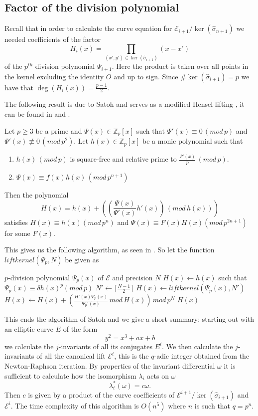 \subsection{Factor of the division polynomial} \label{satohdiv}
Recall that in order to calculate the curve equation for $\mathscr{E}_{i+1}/\ker(\widehat{\sigma}_{n+1})$
we needed coefficients of the factor
$$H_i(x) = \prod_{(x',y')\in \ker(\widehat{\sigma}_{i+1})} (x-x')$$
of the $p^{th}$ division polynomial $\Psi_{i+1}$. Here the product is taken over all points in
the kernel excluding the identity $O$ and up to sign. Since $\#\ker(\widehat{\sigma}_{i+1}) = p$ we have
that $\deg(H_i(x)) = \frac{p-1}{2}$.

The following result is due to Satoh and serves as a modified Hensel lifting \cite{Robert}, it can be found
in \cite{Satoh} and \cite{Handbook}.
\begin{prop}
 Let $p\geq 3$ be a prime and $\Psi(x) \in \mathbb{Z}_p[x]$ such that $\Psi'(x) \equiv 0\, (mod\, p)$ and
$\Psi'(x) \not\equiv 0\, (mod\, p^2)$. Let $h(x) \in \mathbb{Z}_p[x]$ be a monic polynomial such that
\begin{enumerate}
  \item $h(x) \,(mod\,p)$ is square-free and relative prime to $\frac{\Psi'(x)}{p}\,(mod\,p)$.
  \item $\Psi(x) \equiv f(x)h(x)\,(mod\,p^{n+1})$
\end{enumerate}
Then the polynomial
$$H(x) = h(x) + \left(\left(\frac{\Psi(x)}{\Psi'(x)} h'(x)\right)\,(mod\, h(x))\right)$$
satisfies $H(x) \equiv h(x) (mod\, p^n)$ and $\Psi(x) \equiv F(x)H(x) (mod \, p^{2n+1})$ for some $F(x)$.
\end{prop}
This gives us the following algorithm, as seen in \cite{Handbook}. So let the function
$liftkernel(\Psi_p, N)$ be given as
\begin{algorithmic}
\REQUIRE $p$-division polynomial $\Psi_p(x)$ of $\mathscr{E}$ and precision $N$
        \STATE $H(x)\gets h(x)$ such that $\Psi_p(x) \equiv \delta h(x)^p (mod\, p)$
\ELSE
        \STATE $N'\gets \lceil\frac{N-1}{2}\rceil$
	\STATE $H(x)\gets liftkernel(\Psi_p(x), N')$
	\STATE $H(x)\gets H(x) + \left(\frac{H'(x)\Psi_p(x)}{\Psi_p'(x)} \, mod\, H(x) \right)\, mod\, p^N$
\ENDIF
\RETURN $H(x)$
\end{algorithmic}
This ends the algorithm of Satoh and we give a short summary: starting out with
an elliptic curve $E$ of the form $$y^2 = x^3 + ax + b$$ we calculate the $j$-invariants of
all its conjugates $E^i$. We then calculate the $j$-invariants of all the canonical lift $\mathscr{E}^i$,
this is the $q$-adic integer obtained from the Newton-Raphson iteration. By properties of the
invariant differential $\omega$ it is sufficient to calculate how the isomorphism $\lambda_i$ acts on
$\omega$
$$\lambda_i^*(\omega) = c\omega.$$
Then $c$ is given by a product of the curve coefficients of
$\mathscr{E}^{i+1}/\ker(\widehat{\sigma}_{i+1})$ and $\mathscr{E}^i$.
The time complexity of this algorithm is $O(n^5)$ where $n$ is such that $q = p^n$.